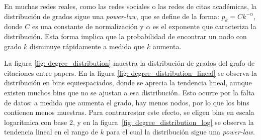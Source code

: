 \documentclass{article}
\begin{document}
En muchas redes reales, como las redes sociales o las redes de citas académicas, la distribución de grados sigue una \textit{power-law}, que se define de la forma: $p_k = Ck^{-\alpha}$, donde $C$ es una constante de normalización y $\alpha$ es el exponente que caracteriza la distribución. Esta forma implica que la probabilidad de encontrar un nodo con grado $k$ disminuye rápidamente a medida que $k$ aumenta.


La figura \ref{fig: degree_distribution} muestra la distribución de grados del grafo de citaciones entre papers. En la figura \ref{fig: degree_distribution_lineal} se observa la distribución en bins equiespaciados, donde se aprecia la tendencia lineal, aunque existen muchos bins que no se ajustan a esa distribución. Esto ocurre por la falta de datos: a medida que aumenta el grado, hay menos nodos, por lo que los bins contienen menos muestras. Para contrarrestar este efecto, se eligen bins en escala logarítmica con base 2, y en la figura~\ref{fig: degree_distribution_log} se observa la tendencia lineal en el rango de $k$ para el cual la distribución sigue una \textit{power-law}.
\end{document}
